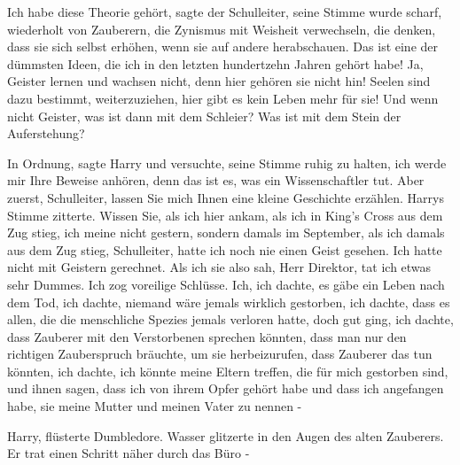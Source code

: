 \glqq Ich habe diese Theorie gehört\grqq{}, sagte der Schulleiter, seine Stimme
wurde scharf, \glqq wiederholt von Zauberern, die Zynismus mit Weisheit
verwechseln, die denken, dass sie sich selbst erhöhen, wenn sie auf andere
herabschauen. Das ist eine der dümmsten Ideen, die ich in den letzten
hundertzehn Jahren gehört habe! Ja, Geister lernen und wachsen nicht, denn hier
gehören sie nicht hin! Seelen sind dazu bestimmt, weiterzuziehen, hier gibt es
kein Leben mehr für sie! Und wenn nicht Geister, was ist dann mit dem Schleier?
Was ist mit dem Stein der Auferstehung?\grqq{}

\glqq In Ordnung\grqq{}, sagte Harry und versuchte, seine Stimme ruhig zu
halten, \glqq ich werde mir Ihre Beweise anhören, denn das ist es, was ein
Wissenschaftler tut. Aber zuerst, Schulleiter, lassen Sie mich Ihnen eine kleine
Geschichte erzählen.\grqq{} Harrys Stimme zitterte. \glqq Wissen Sie, als ich
hier ankam, als ich in King's Cross aus dem Zug stieg, ich meine nicht gestern,
sondern damals im September, als ich damals aus dem Zug stieg, Schulleiter,
hatte ich noch nie einen Geist gesehen. Ich hatte nicht mit Geistern gerechnet.
Als ich sie also sah, Herr Direktor, tat ich etwas sehr Dummes. Ich zog
voreilige Schlüsse. Ich, ich dachte, es gäbe ein Leben nach dem Tod, ich dachte,
niemand wäre jemals wirklich gestorben, ich dachte, dass es allen, die die
menschliche Spezies jemals verloren hatte, doch gut ging, ich dachte, dass
Zauberer mit den Verstorbenen sprechen könnten, dass man nur den richtigen
Zauberspruch bräuchte, um sie herbeizurufen, dass Zauberer das tun könnten, ich
dachte, ich könnte meine Eltern treffen, die für mich gestorben sind, und ihnen
sagen, dass ich von ihrem Opfer gehört habe und dass ich angefangen habe, sie
meine Mutter und meinen Vater zu nennen -\grqq{}

\glqq Harry\grqq{}, flüsterte Dumbledore. Wasser glitzerte in den Augen des
alten Zauberers. Er trat einen Schritt näher durch das Büro -

